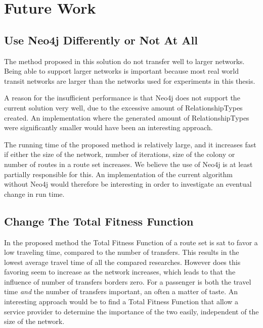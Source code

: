 \section{Future Work}

\subsection*{Use Neo4j Differently or Not At All}
The method proposed in this solution do not transfer well to larger networks. Being able to support larger networks is important because most real world transit networks are larger than the networks used for experiments in this thesis.  

A reason for the insufficient performance is that Neo4j does not support the current solution very well, due to the excessive amount of RelationshipTypes created. An implementation where the generated amount of RelationshipTypes were significantly smaller would have been an interesting approach. 

The running time of the proposed method is relatively large, and it increases fast if either the size of the network, number of iterations, size of the colony or number of routes in a route set increases. We believe the use of Neo4j is at least partially responsible for this. An implementation of the current algorithm without Neo4j would therefore be interesting in order to investigate an eventual change in run time.  

\subsection*{Change The Total Fitness Function}
In the proposed method the Total Fitness Function of a route set is sat to favor a low traveling time, compared to the number of transfers. This results in the lowest average travel time of all the compared researches. However does this favoring seem to increase as the network increases, which leads to that the influence of number of transfers borders zero. For a passenger is both the travel time \textit{and} the number of transfers important, an often a matter of taste. An interesting approach would be to find a Total Fitness Function that allow a service provider to determine the importance of the two easily, independent of the size of the network.

